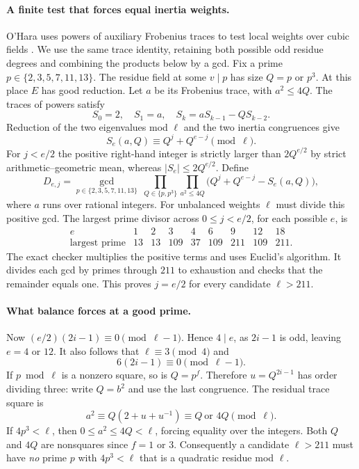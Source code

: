 \documentclass[11pt]{article}
\begin{document}
\paragraph{A finite test that forces equal inertia weights.}
O'Hara uses powers of auxiliary Frobenius traces to test local
weights over cubic fields \cite[\S2.3]{ohara}. We use the same
trace identity, retaining both possible odd residue degrees and
combining the products below by a gcd.
Fix a prime $p\in\{2,3,5,7,11,13\}$. The residue field at some
$v\mid p$ has size $Q=p$ or $p^3$. At this place $E$ has good
reduction. Let $a$ be its Frobenius trace, with $a^2\le4Q$.
The traces of powers satisfy
\[
 S_0=2,\quad S_1=a,\quad S_k=aS_{k-1}-Q S_{k-2}.
\]
Reduction of the two eigenvalues mod $\ell$ and the two inertia
congruences give
\[
   S_e(a,Q)\equiv Q^j+Q^{e-j}\pmod\ell.
\]
For $j<e/2$ the positive right-hand integer is strictly larger
than $2Q^{e/2}$ by strict arithmetic--geometric mean, whereas
$|S_e|\le2Q^{e/2}$. Define
\[
 D_{e,j}=\gcd_{p\in\{2,3,5,7,11,13\}}
     \ \prod_{Q\in\{p,p^3\}}
     \prod_{a^2\le4Q}\bigl(Q^j+Q^{e-j}-S_e(a,Q)\bigr),
\]
where $a$ runs over rational integers. For unbalanced weights $\ell$
must divide this positive gcd. The largest prime divisor across
$0\le j<e/2$, for each possible $e$, is
\[
 \begin{array}{c|rrrrrrrr}
 e&1&2&3&4&6&9&12&18\\ \hline
 \text{largest prime}&13&13&109&37&109&211&109&211 .
 \end{array}
\]
The exact checker multiplies the positive terms and uses Euclid's
algorithm. It divides each gcd by primes through $211$ to exhaustion
and checks that the remainder equals one. This proves $j=e/2$ for
every candidate $\ell>211$.

\paragraph{What balance forces at a good prime.}
Now $(e/2)(2i-1)\equiv0\pmod{\ell-1}$. Hence $4\mid e$, as
$2i-1$ is odd, leaving $e=4$ or $12$. It also follows that
$\ell\equiv3\pmod4$ and
\[
                    6(2i-1)\equiv0\pmod{\ell-1}.
\]
If $p\bmod\ell$ is a nonzero square, so is $Q=p^f$. Therefore
$u=Q^{2i-1}$ has order dividing three: write $Q=b^2$ and use the
last congruence. The residual trace square is
\[
      a^2\equiv Q(2+u+u^{-1})\equiv Q\ \text{or }4Q\pmod\ell.
\]
If $4p^3<\ell$, then $0\le a^2\le4Q<\ell$, forcing equality
over the integers. Both $Q$ and $4Q$ are nonsquares since $f=1$ or
$3$. Consequently a candidate $\ell>211$ must have \emph{no} prime
$p$ with $4p^3<\ell$ that is a quadratic residue mod $\ell$.
\end{document}
